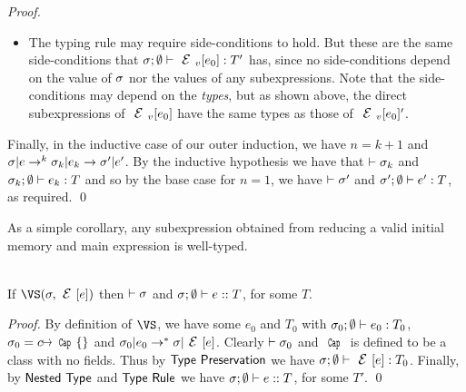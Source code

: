 \begin{proof}
\begin{itemize}
	\item The typing rule may require side-conditions to hold. But these are the same side-conditions that $\tyr{\EV[e_0]}{T'}$ has, since no side-conditions depend on the value of $\sigma$ nor the values of any subexpressions. Note that the side-conditions may depend on the \emph{types}, but as shown above, the direct subexpressions of $\EV[e_0]$ have the same types as those of $\EV[e_0]'$.
	\end{itemize}
%

	\noindent Finally, in the inductive case of our outer induction, we have $n = k+1$ and $\sigma|e\rightarrow^{k}\sigma_k|e_k\rightarrow\sigma'|e'$.
	By the inductive hypothesis we have that $\vdash\sigma_k$ and $\tyr[\s_k]{e_k}T$
	and so by the base case for $n = 1$, we have $\vdash\sigma'$ and $\tyr[\s']{e'}T$,
	as required.
	\qed\end{proof}

\LS

As a simple corollary, any subexpression obtained from reducing a valid initial memory and main expression is well-typed.

\SS\begin{Corollary}\ \\
	\indent If $\VS(\s,\E[e])$ then $\vdash\sigma$ and $\tyer eT$, for some $T$.
\end{Corollary}
\SS\begin{proof}
	By definition of $\VS$, we have some $e_0$ and $T_0$ with $\tyr[\s_0]{e_0}T_0$,
	$\s_0 = c\mapsto\Kw{Cap}\{\}$ and $\s_0|e_0\rightarrow^*\s|\E[e]$. Clearly
	$\vdash\sigma_0$ and $\Kw{Cap}$ is defined to be a class with no fields.
	Thus by $\textsf{Type Preservation}$ we have $\tyr {\E[e]}{T_0}$.
	Finally, by $\textsf{Nested Type}$ and $\textsf{Type Rule}$ we have
	$\tyer eT$, for some
	$T'$.
\qed\end{proof}

